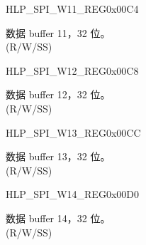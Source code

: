 \begin{register}{H}{LP\_SPI\_W11\_REG}{0x00C4}\label{regdesc:LPSPIW11REG}
%
\regnewline%
\begin{regdesc}\begin{reglist}
\label{fielddesc:LPSPIBUF11}\item [LP\_SPI\_BUF11] 数据 buffer 11，32 位。\\
(R/W/SS)
\end{reglist}\end{regdesc}
\end{register}


\begin{register}{H}{LP\_SPI\_W12\_REG}{0x00C8}\label{regdesc:LPSPIW12REG}
%
\regnewline%
\begin{regdesc}\begin{reglist}
\label{fielddesc:LPSPIBUF12}\item [LP\_SPI\_BUF12] 数据 buffer 12，32 位。\\
(R/W/SS)
\end{reglist}\end{regdesc}
\end{register}


\begin{register}{H}{LP\_SPI\_W13\_REG}{0x00CC}\label{regdesc:LPSPIW13REG}
%
\regnewline%
\begin{regdesc}\begin{reglist}
\label{fielddesc:LPSPIBUF13}\item [LP\_SPI\_BUF13] 数据 buffer 13，32 位。\\
(R/W/SS)
\end{reglist}\end{regdesc}
\end{register}


\begin{register}{H}{LP\_SPI\_W14\_REG}{0x00D0}\label{regdesc:LPSPIW14REG}
%
\regnewline%
\begin{regdesc}\begin{reglist}
\label{fielddesc:LPSPIBUF14}\item [LP\_SPI\_BUF14] 数据 buffer 14，32 位。\\
(R/W/SS)
\end{reglist}\end{regdesc}
\end{register}


